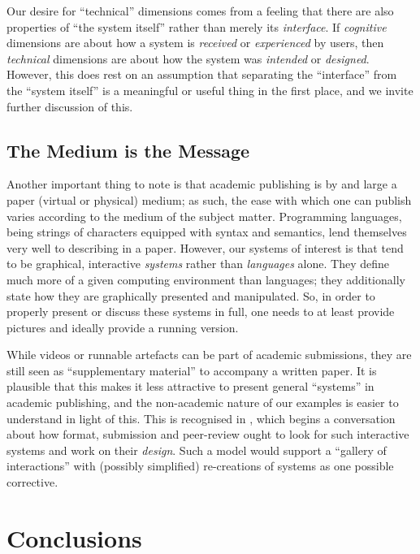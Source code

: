 Our desire for ``technical'' dimensions comes from a feeling that there
are also properties of ``the system itself'' rather than merely its
\emph{interface}. If \emph{cognitive} dimensions are about how a system
is \emph{received} or \emph{experienced} by users, then \emph{technical}
dimensions are about how the system was \emph{intended} or
\emph{designed}. However, this does rest on an assumption that
separating the ``interface'' from the ``system itself'' is a meaningful
or useful thing in the first place, and we invite further discussion of
this.

\hypertarget{the-medium-is-the-message}{%
\subsection{The Medium is the Message}\label{the-medium-is-the-message}}

Another important thing to note is that academic publishing is by and
large a paper (virtual or physical) medium; as such, the ease with which
one can publish varies according to the medium of the subject matter.
Programming languages, being strings of characters equipped with syntax
and semantics, lend themselves very well to describing in a paper.
However, our systems of interest is that tend to be graphical,
interactive \emph{systems} rather than \emph{languages} alone. They
define much more of a given computing environment than languages; they
additionally state how they are graphically presented and manipulated.
So, in order to properly present or discuss these systems in full, one
needs to at least provide pictures and ideally provide a running
version.

While videos or runnable artefacts can be part of academic submissions,
they are still seen as ``supplementary material'' to accompany a written
paper. It is plausible that this makes it less attractive to present
general ``systems'' in academic publishing, and the non-academic nature
of our examples is easier to understand in light of this. This is
recognised in \cite{eval-prog-sys}, which begins a conversation about
how format, submission and peer-review ought to look for such
interactive systems and work on their \emph{design}. Such a model would
support a ``gallery of interactions'' with (possibly simplified)
re-creations of systems as one possible corrective.

\hypertarget{conclusions}{%
\section{Conclusions}\label{conclusions}}

